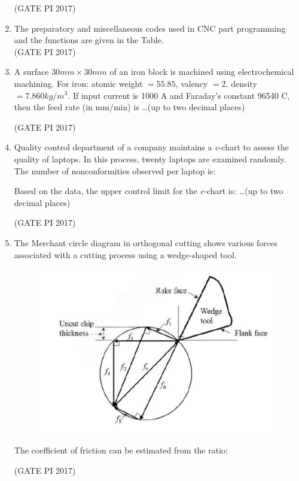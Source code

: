 \documentclass[journal,12pt,onecolumn]{IEEEtran}
\theoremstyle{remark}
\begin{document}
\begin{enumerate}


\hfill (GATE PI 2017)

\item The preparatory and miscellaneous codes used in CNC part programming and the functions are given in the Table. \\



\hfill (GATE PI 2017)

\item A surface $30 mm \times 30 mm$ of an iron block is machined using electrochemical machining.  
For iron: atomic weight $=55.85$, valency $= 2$, density $= 7.860 kg/m^3$.  
If input current is 1000 A and Faraday's constant 96540 C,  
then the feed rate (in mm/min) is \dots (up to two decimal places)   

\hfill (GATE PI 2017)

\item Quality control department of a company maintains a \textit{c}-chart to assess the quality of laptops.  
In this process, twenty laptops are examined randomly. The number of nonconformities observed per laptop is: 



Based on the data, the upper control limit for the \textit{c}-chart is:  
\dots (up to two decimal places) 

\hfill (GATE PI 2017)

\item The Merchant circle diagram in orthogonal cutting shows various forces associated with a cutting process using a wedge\--shaped tool.  

\begin{figure}[H]
    \centering
    \includegraphics[width=0.5\columnwidth]{fig10.png}
    \caption{}
    \label{fig:placeholder}
\end{figure}

The coefficient of friction can be estimated from the ratio:

\begin{enumerate}
\end{enumerate}
\hfill (GATE PI 2017)


\end{enumerate}
\end{document}

